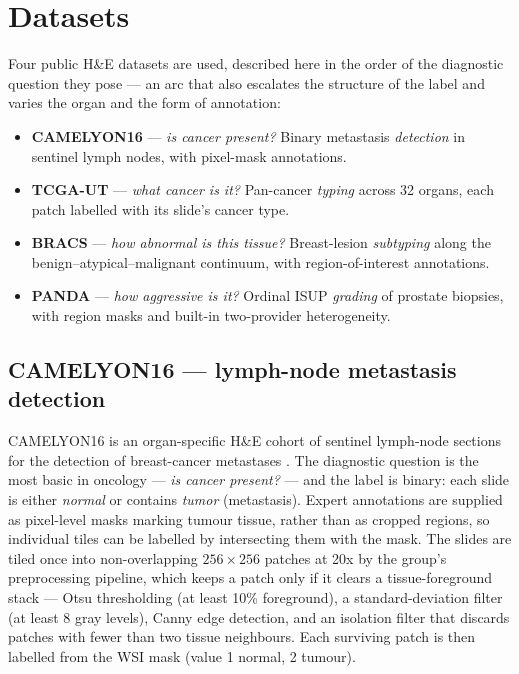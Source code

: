 \documentclass[11pt]{article}
\begin{document}
\section{Datasets}
\label{sec:datasets}
Four public H\&E datasets are used, described here in the order of the diagnostic question they
pose --- an arc that also escalates the structure of the label and varies the organ and the form of
annotation:

\begin{itemize}
  \item \textbf{CAMELYON16} --- \emph{is cancer present?} Binary metastasis \emph{detection} in
        sentinel lymph nodes, with pixel-mask annotations.
  \item \textbf{TCGA-UT} --- \emph{what cancer is it?} Pan-cancer \emph{typing} across 32 organs,
        each patch labelled with its slide's cancer type.
  \item \textbf{BRACS} --- \emph{how abnormal is this tissue?} Breast-lesion \emph{subtyping} along
        the benign--atypical--malignant continuum, with region-of-interest annotations.
  \item \textbf{PANDA} --- \emph{how aggressive is it?} Ordinal ISUP \emph{grading} of prostate
        biopsies, with region masks and built-in two-provider heterogeneity.
\end{itemize}

\subsection{CAMELYON16 --- lymph-node metastasis detection}
\label{sec:camelyon16}
CAMELYON16 is an organ-specific H\&E cohort of sentinel lymph-node sections for the detection of
breast-cancer metastases \citep{bejnordi2017diagnostic,litjens2018gigascience}. The diagnostic
question is the most basic in oncology --- \emph{is cancer present?} --- and the label is binary:
each slide is either \emph{normal} or contains \emph{tumor} (metastasis). Expert annotations are
supplied as pixel-level masks marking tumour tissue, rather than as cropped regions, so individual
tiles can be labelled by intersecting them with the mask. The slides are tiled once into
non-overlapping $256\times256$ patches at \num{20}x by the group's preprocessing pipeline, which keeps
a patch only if it clears a tissue-foreground stack --- Otsu thresholding (at least \num{10}\%
foreground), a standard-deviation filter (at least \num{8} gray levels), Canny edge detection, and an
isolation filter that discards patches with fewer than two tissue neighbours. Each surviving patch is
then labelled from the WSI mask (value \num{1} normal, \num{2} tumour).
\end{document}
